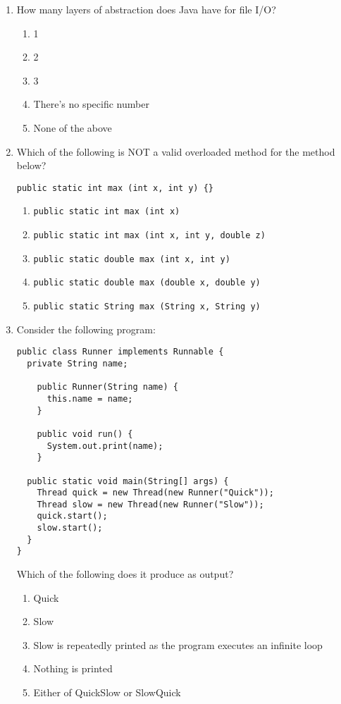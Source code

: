 \documentclass[S17-Final.tex]{subfiles}
\begin{document}
\begin{enumerate}
\item How many layers of abstraction does Java have for file I/O?

\begin{enumerate}
\item  1
\item  2
\item  3
\item  There’s no specific number
\item  None of the above
\end{enumerate}

\clearpage

\item Which of the following is NOT a valid overloaded method for the method below?
\begin{lstlisting}
public static int max (int x, int y) {}
\end{lstlisting}

\begin{enumerate}
\item  \texttt{public static int max (int x) {}}  
\item  \texttt{public static int max (int x, int y, double z) {}}
\item  \texttt{public static double max (int x, int y) {}}  
\item  \texttt{public static double max (double x, double y) {}}
\item  \texttt{public static String max (String x, String y) {}}  
\end{enumerate}

\item Consider the following program: 
\begin{lstlisting}
public class Runner implements Runnable { 
  private String name;

    public Runner(String name) { 
      this.name = name; 
    } 

    public void run() { 
      System.out.print(name); 
    } 

  public static void main(String[] args) { 
    Thread quick = new Thread(new Runner("Quick")); 
    Thread slow = new Thread(new Runner("Slow")); 
    quick.start(); 
    slow.start(); 
  } 
} 
\end{lstlisting}

Which of the following does it produce as output? 

\begin{enumerate}
\item  Quick
\item  Slow
\item  Slow is repeatedly printed as the program executes an infinite loop 
\item  Nothing is printed 
\item  Either of QuickSlow or SlowQuick
\end{enumerate}


\end{enumerate}
\end{document}
